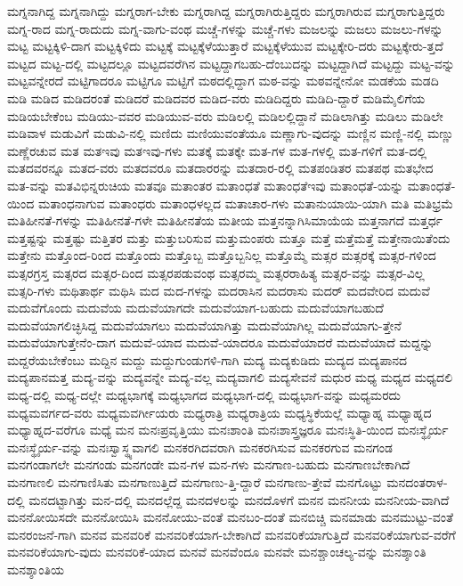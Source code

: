 {ಮಗ್ನನಾಗಿದ್ದ
ಮಗ್ನನಾಗಿದ್ದು
ಮಗ್ನರಾಗ-ಬೇಕು
ಮಗ್ನರಾಗಿದ್ದ
ಮಗ್ನರಾಗಿರುತ್ತಿದ್ದರು
ಮಗ್ನರಾಗಿರುವ
ಮಗ್ನರಾಗುತ್ತಿದ್ದರು
ಮಗ್ನ-ರಾದ
ಮಗ್ನ-ರಾದುದು
ಮಗ್ನ-ವಾಗು-ವಂಥ
ಮಚ್ಚೆ-ಗಳನ್ನು
ಮಚ್ಚೆ-ಗಳು
ಮಜಲನ್ನು
ಮಜಲು
ಮಜಲು-ಗಳನ್ನು
ಮಟ್ಟ
ಮಟ್ಟಕ್ಕಿಳಿ-ದಾಗ
ಮಟ್ಟಕ್ಕಿಳಿದು
ಮಟ್ಟಕ್ಕೆ
ಮಟ್ಟಕ್ಕೆಳೆಯುತ್ತಾರೆ
ಮಟ್ಟಕ್ಕೆಳೆಯುವ
ಮಟ್ಟಕ್ಕೇರಿ-ದರು
ಮಟ್ಟಕ್ಕೇರು-ತ್ತದೆ
ಮಟ್ಟದ
ಮಟ್ಟ-ದಲ್ಲಿ
ಮಟ್ಟದಲ್ಲೂ
ಮಟ್ಟದವರೆಗಿನ
ಮಟ್ಟದ್ದಾಗಬಹು-ದೆಂಬುದನ್ನು
ಮಟ್ಟದ್ದಾಗಿದೆ
ಮಟ್ಟದ್ದು
ಮಟ್ಟ-ವನ್ನು
ಮಟ್ಟವನ್ನೇರದೆ
ಮಟ್ಟಿಗಾದರೂ
ಮಟ್ಟಿಗೂ
ಮಟ್ಟಿಗೆ
ಮಠದಲ್ಲಿದ್ದಾಗ
ಮಠ-ವನ್ನು
ಮಠವನ್ನೇನೋ
ಮಡಕೆಯ
ಮಡದಿ
ಮಡಿ
ಮಡಿದ
ಮಡಿದರಂತೆ
ಮಡಿದರೆ
ಮಡಿದವರ
ಮಡಿದ-ವರು
ಮಡಿದಿದ್ದರು
ಮಡಿದಿ-ದ್ದಾರೆ
ಮಡಿಮೈಲಿಗೆಯ
ಮಡಿಯಬೇಕೆಂಬ
ಮಡಿಯು-ವವರ
ಮಡಿಯುವ-ವರು
ಮಡಿಲಲ್ಲಿ
ಮಡಿಲಲ್ಲಿದ್ದಾನೆ
ಮಡಿಲಾಗಿತ್ತು
ಮಡಿಲು
ಮಡಿಲೇ
ಮಡಿವಾಳ
ಮಡುವಿಗೆ
ಮಡುವಿ-ನಲ್ಲಿ
ಮಣಿದು
ಮಣಿಯುವಂತೆಯೂ
ಮಣ್ಣಾಗು-ವುದನ್ನು
ಮಣ್ಣಿನ
ಮಣ್ಣಿ-ನಲ್ಲಿ
ಮಣ್ಣು
ಮಣ್ಣೆರಚುವ
ಮತ
ಮತಇವು
ಮತಇವು-ಗಳು
ಮತಕ್ಕೆ
ಮತಕ್ಕೇ
ಮತ-ಗಳ
ಮತ-ಗಳಲ್ಲಿ
ಮತ-ಗಳಿಗೆ
ಮತ-ದಲ್ಲಿ
ಮತದವರನ್ನೂ
ಮತದ-ವರು
ಮತದವರೂ
ಮತದಾರರನ್ನು
ಮತದಾರ-ರಲ್ಲಿ
ಮತಪಂಡಿತರ
ಮತಪಥ
ಮತಭೇದ
ಮತ-ವನ್ನು
ಮತವಿಭಿನ್ನರುಚಿಯ
ಮತವೂ
ಮತಾಂತರ
ಮತಾಂಧತೆ
ಮತಾಂಧತೆಇವು
ಮತಾಂಧತೆ-ಯನ್ನು
ಮತಾಂಧತೆ-ಯಿಂದ
ಮತಾಂಧನಾಗುವ
ಮತಾಂಧರು
ಮತಾಂಧಳಲ್ಲದ
ಮತಾಚಾರ-ಗಳು
ಮತಾನುಯಾಯಿ-ಯಾಗಿ
ಮತಿ
ಮತಿಭ್ರಮೆ
ಮತಿಹೀನತೆ-ಗಳನ್ನು
ಮತಿಹೀನತೆ-ಗಳೇ
ಮತಿಹೀನತೆಯ
ಮತೀಯ
ಮತ್ತನನ್ನಾಗಿಸಿಮಾಯೆಯ
ಮತ್ತನಾಗದೆ
ಮತ್ತರ್ಧ
ಮತ್ತಷ್ಟನ್ನು
ಮತ್ತಷ್ಟು
ಮತ್ತಿತರ
ಮತ್ತು
ಮತ್ತುಬರಿಸುವ
ಮತ್ತುಮಂಪರು
ಮತ್ತೂ
ಮತ್ತೆ
ಮತ್ತೆಮತ್ತೆ
ಮತ್ತೇನಾಯಿತೆಂದು
ಮತ್ತೇನು
ಮತ್ತೊಂದ-ರಿಂದ
ಮತ್ತೊಂದು
ಮತ್ತೊಬ್ಬ
ಮತ್ತೊಬ್ಬನಿಲ್ಲ
ಮತ್ತೊಮ್ಮೆ
ಮತ್ಸರ
ಮತ್ಸರಕ್ಕೆ
ಮತ್ಸರ-ಗಳಿಂದ
ಮತ್ಸರಗ್ರಸ್ತ
ಮತ್ಸರದ
ಮತ್ಸರ-ದಿಂದ
ಮತ್ಸರಪಡುವಂಥ
ಮತ್ಸರಮ್ಮ
ಮತ್ಸರರಾಹಿತ್ಯ
ಮತ್ಸರ-ವನ್ನು
ಮತ್ಸರ-ವಿಲ್ಲ
ಮತ್ಸರಿ-ಗಳು
ಮಥಿತಾರ್ಥ
ಮಥಿಸಿ
ಮದ
ಮದ-ಗಳನ್ನು
ಮದರಾಸಿನ
ಮದರಾಸು
ಮದರ್
ಮದವೇರಿದ
ಮದುವೆ
ಮದುವೆಗೊಂದು
ಮದುವೆಯ
ಮದುವೆಯಾಗದೇ
ಮದುವೆಯಾಗ-ಬಹುದು
ಮದುವೆಯಾಗಬಹುದೆ
ಮದುವೆಯಾಗಲಿಚ್ಛಿಸಿದ್ದ
ಮದುವೆಯಾಗಲು
ಮದುವೆಯಾಗಿತ್ತು
ಮದುವೆಯಾಗಿಲ್ಲ
ಮದುವೆಯಾಗು-ತ್ತೇನೆ
ಮದುವೆಯಾಗುತ್ತೇನೆಂ-ದಾಗ
ಮದುವೆ-ಯಾದ
ಮದುವೆ-ಯಾದರೂ
ಮದುವೆಯಾದರೆ
ಮದುವೆಯಾದೆ
ಮದ್ದನ್ನು
ಮದ್ದರೆಯಬೇಕೆಂಬು
ಮದ್ದಿನ
ಮದ್ದು
ಮದ್ದುಗುಂಡುಗಳಿ-ಗಾಗಿ
ಮದ್ಯ
ಮದ್ಯಕುಡಿದು
ಮದ್ಯದ
ಮದ್ಯಪಾನದ
ಮದ್ಯಪಾನಮತ್ತ
ಮದ್ಯ-ವನ್ನು
ಮದ್ಯವನ್ನೇ
ಮದ್ಯ-ವಲ್ಲ
ಮದ್ಯವಾಗಲಿ
ಮದ್ಯಸೇವನೆ
ಮಧುರ
ಮಧ್ಯ
ಮಧ್ಯದ
ಮಧ್ಯದಲಿ
ಮಧ್ಯ-ದಲ್ಲಿ
ಮಧ್ಯ-ದಲ್ಲೇ
ಮಧ್ಯಭಾಗಕ್ಕೆ
ಮಧ್ಯಭಾಗದ
ಮಧ್ಯಭಾಗ-ದಲ್ಲಿ
ಮಧ್ಯಭಾಗ-ವನ್ನು
ಮಧ್ಯಮರದು
ಮಧ್ಯಮವರ್ಗದ-ವರು
ಮಧ್ಯಮವರ್ಗೀಯರು
ಮಧ್ಯರಾತ್ರಿ
ಮಧ್ಯರಾತ್ರಿಯ
ಮಧ್ಯಸ್ಥಿಕೆಯಲ್ಲೆ
ಮಧ್ಯಾಹ್ನ
ಮಧ್ಯಾಹ್ನದ
ಮಧ್ಯಾಹ್ನದ-ವರೆಗೂ
ಮಧ್ಯೆ
ಮನ
ಮನಃಪ್ರವೃತ್ತಿಯು
ಮನಃಶಾಂತಿ
ಮನಃಶಾಸ್ತ್ರಜ್ಞರೂ
ಮನಃಸ್ಥಿತಿ-ಯಿಂದ
ಮನಃಸ್ಥೈರ್ಯ
ಮನಃಸ್ಥೈರ್ಯ-ವನ್ನು
ಮನಃಸ್ವಾಸ್ಥ್ಯವಾಗಲಿ
ಮನಕರಗಿದವರಾಗಿ
ಮನಕರಗಿಸುವ
ಮನಕರಗುವ
ಮನಗಂಡ
ಮನಗಂಡಾಗಲೇ
ಮನಗಂಡು
ಮನಗಂಡೇ
ಮನ-ಗಳ
ಮನ-ಗಳು
ಮನಗಾಣ-ಬಹುದು
ಮನಗಾಣಬೇಕಾಗಿದೆ
ಮನಗಾಣಲಿ
ಮನಗಾಣಿಸಿತು
ಮನಗಾಣುತ್ತಿದೆ
ಮನಗಾಣು-ತ್ತಿ-ದ್ದಾರೆ
ಮನಗಾಣು-ತ್ತೇವೆ
ಮನಗೊಟ್ಟು
ಮನದಂತರಾಳ-ದಲ್ಲಿ
ಮನದಟ್ಟಾಗಿತ್ತು
ಮನ-ದಲ್ಲಿ
ಮನದಲ್ಲೆದ್ದ
ಮನದಳಲನ್ನು
ಮನದೊಳಗೆ
ಮನನ
ಮನನೀಯ
ಮನನೀಯ-ವಾಗಿದೆ
ಮನನೋಯಿಸದೇ
ಮನನೋಯಿಸಿ
ಮನನೋಯು-ವಂತೆ
ಮನಬಂ-ದಂತೆ
ಮನಬಿಚ್ಚಿ
ಮನಮಾಡು
ಮನಮುಟ್ಟು-ವಂತೆ
ಮನರಂಜನೆ-ಗಾಗಿ
ಮನವ
ಮನವರಿಕೆ
ಮನವರಿಕೆಯಾಗ-ಬೇಕಾಗಿದೆ
ಮನವರಿಕೆಯಾಗುತ್ತಿದೆ
ಮನವರಿಕೆಯಾಗುವ-ವರೆಗೆ
ಮನವರಿಕೆಯಾಗು-ವುದು
ಮನವರಿಕೆ-ಯಾದ
ಮನವೆ
ಮನವೆಂದೂ
ಮನವೇ
ಮನಶ್ಚಾಂಚಲ್ಯ-ವನ್ನು
ಮನಶ್ಶಾಂತಿ
ಮನಶ್ಶಾಂತಿಯ
}
